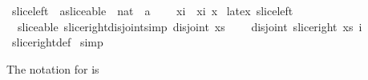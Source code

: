 \begin{isabellebody}
\ slice{\isacharunderscore}left\ {\isacharcolon}{\isacharcolon}\ {\isachardoublequoteopen}{\isacharprime}a{\isacharcolon}{\isacharcolon}sliceable\ {\isasymRightarrow}\ nat\ {\isasymRightarrow}\ {\isacharprime}a{\isachardoublequoteclose}\ {\isacharparenleft}{\isachardoublequoteopen}{\isacharparenleft}{}{\isacharunderscore}{\isasymdagger}{\isacharunderscore}{\isachardot}{\isachardot}{\isacharparenright}{\isachardoublequoteclose}\ {\isacharbrackleft}{}{}{\isacharcomma}{}{}{\isacharbrackright}\ {}{}{\isacharparenright}\isanewline
{}\ {\isachardoublequoteopen}x{\isasymdagger}i{\isachardot}{\isachardot}\ {\isacharequal}\ x{\isasymdagger}i{\isachardot}{\isachardot}{\isacharparenleft}{\isacharhash}\ x{\isacharparenright}{\isachardoublequoteclose}\isanewline
\isanewline
{}\isamarkupfalse%
\ {\isacharparenleft}{\isachardoublequoteopen}latex{\isachardoublequoteclose}{\isacharparenright}\ slice{\isacharunderscore}left\ \ {\isacharparenleft}{\isachardoublequoteopen}{\isacharparenleft}{}{\isacharunderscore}\isactrlbsub {\isacharbrackleft}{\isacharunderscore}{\isachardot}{\isachardot}{\isacharbrackright}\isactrlesub {\isacharparenright}{\isachardoublequoteclose}\ {\isacharbrackleft}{}{}{\isacharcomma}{}{}{\isacharbrackright}\ {}{}{\isacharparenright}%
\isamarkuptrue%
\isamarkupfalse%
\ {\isacharparenleft}\ sliceable{\isacharparenright}\ slice{\isacharunderscore}right{\isacharunderscore}disjoint{\isacharbrackleft}simp{\isacharbrackright}{\isacharcolon}\ {\isachardoublequoteopen}disjoint\ xs\ {\isasymLongrightarrow}\ \isanewline
\ \ disjoint\ {\isacharparenleft}slice{\isacharunderscore}right\ xs\ i{\isacharparenright}{\isachardoublequoteclose}\isanewline
%
\isadelimproof
%
\endisadelimproof
%
\isatagproof
{}\isamarkupfalse%
\ slice{\isacharunderscore}right{\isacharunderscore}def\isanewline
{}\isamarkupfalse%
\ simp%
\endisatagproof
{\isafoldproof}%
%
\isadelimproof
%
\endisadelimproof
%
\begin{isamarkuptext}%
The notation for  is %
\end{isamarkuptext}\isamarkuptrue%
\isamarkupfalse%

\end{isabellebody}
